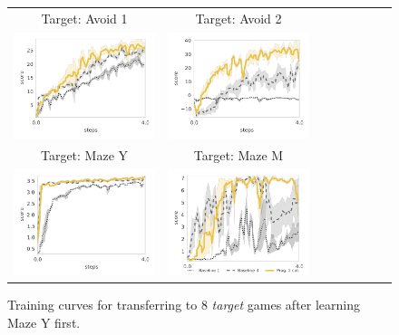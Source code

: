 \begin{figure}
\begin{tabular}{cccccccc}
	Target: Avoid 1 & Target: Avoid 2 \\
        \includegraphics[width=.44\textwidth]{figures/app_plots/lab/smy1/seekavoid_arena_01} &
        \includegraphics[width=.44\textwidth]{figures/app_plots/lab/smy1/seekavoid_arena_02} \\

	Target: Maze Y & Target: Maze M \\
        \includegraphics[width=.44\textwidth]{figures/app_plots/lab/smy1/seek_maze_y_01} &
        \includegraphics[width=.44\textwidth]{figures/app_plots/lab_legend/smy1/seek_maze_m_01} \\
    \end{tabular}
\caption{Training curves for transferring to 8 \textit{target} games after learning Maze Y first.}
    \label{fig:app_plot_lab}
\end{figure}

